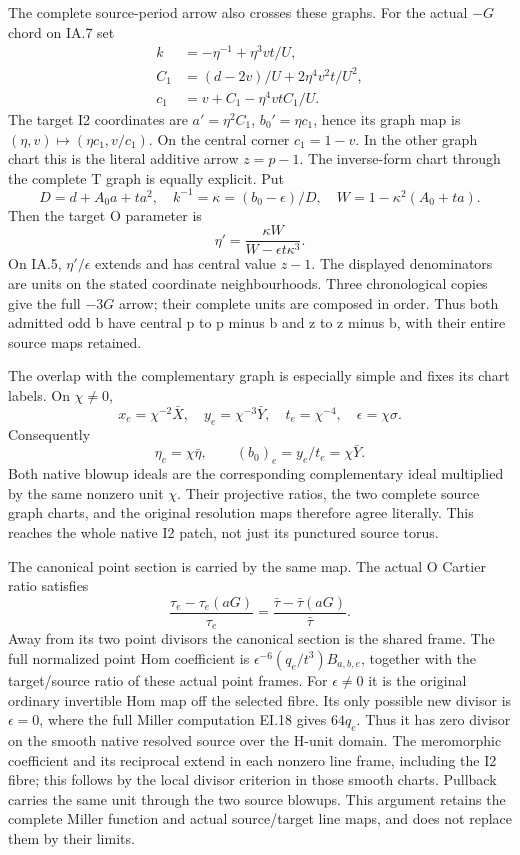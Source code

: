 The complete source-period arrow also crosses these graphs.
For the actual \(-G\) chord on IA.7 set
\[
 \begin{aligned}
 k&=-\eta^{-1}+\eta^3vt/U,\\
 C_1&=(d-2v)/U+2\eta^4v^2t/U^2,\\
 c_1&=v+C_1-\eta^4vtC_1/U.
 \end{aligned}
\tag{IA.9}
\]
The target I2 coordinates are
\(a'=\eta^2C_1\), \(b_0'=\eta c_1\), hence its graph
map is \((\eta,v)\mapsto(\eta c_1,v/c_1)\).
On the central corner \(c_1=1-v\). In the other graph chart
this is the literal additive arrow \(z=p-1\).
The inverse-form chart through the complete T graph is equally
explicit. Put
\[
 D=d+A_0a+t a^2,\quad
 k^{-1}=\kappa=(b_0-\epsilon)/D,\quad
 W=1-\kappa^2(A_0+ta).
\]
Then the target O parameter is
\[
 \eta'=\frac{\kappa W}{W-\epsilon t\kappa^3}.
\tag{IA.10}
\]
On IA.5, \(\eta'/\epsilon\) extends and has central
value \(z-1\). The displayed denominators are units on
the stated coordinate neighbourhoods. Three chronological
copies give the full \(-3G\) arrow; their complete units
are composed in order. Thus both admitted odd b have
central p to p minus b and z to z minus b, with their
entire source maps retained.

The overlap with the complementary graph is especially
simple and fixes its chart labels. On \(\chi\ne0\),
\[
 x_e=\chi^{-2}\bar X,\quad y_e=\chi^{-3}\bar Y,
 \quad t_e=\chi^{-4},\quad\epsilon=\chi\sigma.
\]
Consequently
\[
 \eta_e=\chi\bar\eta,\qquad
 (b_0)_e=y_e/t_e=\chi\bar Y.
\tag{IA.11}
\]
Both native blowup ideals are the corresponding
complementary ideal multiplied by the same nonzero unit
\(\chi\). Their projective ratios, the two complete
source graph charts, and the original resolution maps
therefore agree literally. This reaches the whole native
I2 patch, not just its punctured source torus.

The canonical point section is carried by the same map.
The actual O Cartier ratio satisfies
\[
 \frac{\tau_e-\tau_e(aG)}{\tau_e}
  =\frac{\bar\tau-\bar\tau(aG)}{\bar\tau}.
\tag{IA.12}
\]
Away from its two point divisors the canonical section
is the shared frame. The full normalized point Hom
coefficient is
\(\epsilon^{-6}(q_e/t^3)B_{a,b,e}\), together with
the target/source ratio of these actual point frames.
For \(\epsilon\ne0\) it is the original ordinary
invertible Hom map off the selected fibre. Its only
possible new divisor is \(\epsilon=0\), where the full
Miller computation EI.18 gives \(64q_e\). Thus it has
zero divisor on the smooth native resolved source over
the H-unit domain. The meromorphic coefficient and its
reciprocal extend in each nonzero line frame, including
the I2 fibre; this follows by the local divisor criterion
in those smooth charts. Pullback carries the same unit
through the two source blowups. This argument retains
the complete Miller function and actual source/target
line maps, and does not replace them by their limits.

